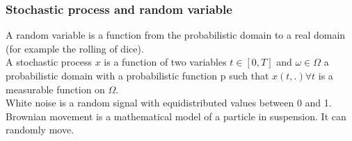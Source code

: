 \documentclass[../main.tex]{subfiles}
\begin{document}
\subsubsection{Stochastic process and random variable}
A random variable is a function from the probabilistic domain to a real domain (for example the rolling of dice). \\
A stochastic process $x$ is a function of two variables $t \in [0,T]$ and $\omega \in \Omega$ a probabilistic domain with a probabilistic function p such that $x(t,.) \forall t$ is a measurable function on $\Omega$.\\
White noise is a random signal with equidistributed values between 0 and 1.\\
Brownian movement is a mathematical model of a particle in suspension. It can randomly move.
\end{document}
